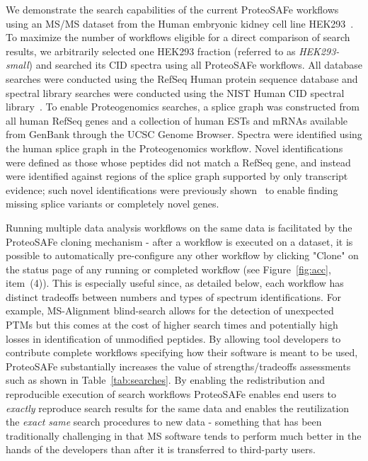 \documentclass[arial,11pt]{article}
\newcommand{\SF}[1]{\textsf{#1}}
\newcommand{\SYSTEM}[0]{\SF{ProteoSAFe}\xspace}
\begin{document}
We demonstrate the search capabilities of the current ProteoSAFe workflows using an MS/MS dataset from the Human embryonic kidney cell line HEK293~\cite{Kim:2010}.
 To maximize the number of workflows eligible for a direct comparison of search results, we arbitrarily selected one HEK293 fraction
 (referred to as {\em HEK293-small}) and searched its CID spectra using all ProteoSAFe workflows.
All database searches were conducted using the RefSeq Human protein sequence database and spectral library searches were conducted using the NIST Human CID spectral library~\cite{Stein:2010}. To enable Proteogenomics searches, a splice graph was constructed from all human RefSeq genes and a collection of human ESTs and mRNAs available from GenBank through the UCSC Genome Browser.
Spectra were identified using the human splice graph in the Proteogenomics workflow. Novel identifications were defined as those whose peptides did not match a RefSeq gene, and instead were identified against regions of the splice graph supported by only transcript evidence; such novel identifications were previously shown~\cite{Castellana:2008} to enable finding missing splice variants or completely novel genes.

Running multiple data analysis workflows on the same data is facilitated by the ProteoSAFe cloning mechanism - after a workflow is executed on a dataset, it is possible to automatically pre-configure any other workflow by clicking "Clone" on the status page of any running or completed workflow (see Figure~\ref{fig:acc}, item~{(4)}).
This is especially useful since, as detailed below, each workflow has distinct tradeoffs between numbers and types of spectrum identifications. For example, MS-Alignment blind-search allows for the detection of unexpected PTMs but this comes at the cost of higher search times and potentially high losses in identification of unmodified peptides. By allowing tool developers to contribute complete workflows specifying how their software is meant to be used, \SYSTEM substantially increases the value of strengths/tradeoffs assessments such as shown in Table~\ref{tab:searches}. By enabling the redistribution and reproducible execution of search workflows \SYSTEM enables end users to {\em exactly} reproduce search results for the same data and enables the reutilization the {\em exact same} search procedures to new data - something that has been traditionally challenging in that MS  software tends to perform much better in the hands of the developers than after it is transferred to third-party users.
\end{document}
